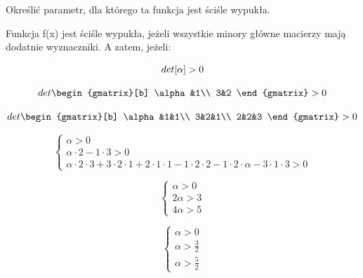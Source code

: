 \documentclass{article}
\begin{document}
Określić parametr, dla którego ta funkcja jest ściśle wypukła.\\
\newline

Funkcja f(x) jest ściśle wypukła, jeżeli wszystkie minory główne macierzy mają
dodatnie wyznaczniki. A zatem, jeżeli:

\begin{equation}
  det[\alpha] >  0\\
\end{equation}

\begin{equation}
  det
  \begin{gmatrix}[b]
    \alpha&1\\
    3&2
  \end{gmatrix}
  > 0
\end{equation}

\begin{equation}
  det
  \begin{gmatrix}[b]
    \alpha&1&1\\
    3&2&1\\
    2&2&3
  \end{gmatrix}
  > 0
\end{equation}

\begin{equation}
  \begin{cases}
    \alpha > 0\\
    \alpha \cdot 2 - 1 \cdot 3 > 0\\
    \alpha \cdot 2 \cdot 3 + 3 \cdot 2 \cdot 1 + 2 \cdot 1 \cdot 1 - 1 \cdot 2 \cdot 2 - 
    1 \cdot 2 \cdot \alpha - 3 \cdot 1 \cdot 3 >0
  \end{cases}
\end{equation}

\begin{equation}
  \begin{cases}
    \alpha > 0\\
    2\alpha > 3\\
    4\alpha >5
  \end{cases}
\end{equation}

\begin{equation}
  \begin{cases}
    \alpha > 0\\
    \alpha > \frac{3}{2}\\
    \alpha >\frac{5}{2}
  \end{cases}
\end{equation}
\end{document}
